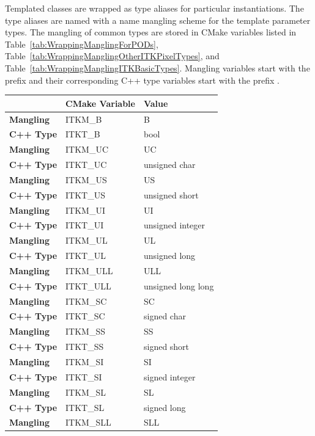 Templated classes are wrapped as type aliases for particular instantiations. The
type aliases are named with a name mangling scheme for the template parameter
types. The mangling of common types are stored in CMake variables listed in
Table~\ref{tab:WrappingManglingForPODs},
Table~\ref{tab:WrappingManglingOtherITKPixelTypes}, and
Table~\ref{tab:WrappingManglingITKBasicTypes}. Mangling variables start with the prefix
 and their corresponding C++ type variables start with the
prefix .

\begin{table}
\begin{center}
\begin{tabular}{lll}
\toprule
& \textbf{CMake Variable} & \textbf{Value} \\
\midrule
\midrule
\textbf{Mangling} & ITKM\_B & B \\
\textbf{C++ Type} & ITKT\_B & bool \\
\midrule
\textbf{Mangling} & ITKM\_UC & UC \\
\textbf{C++ Type} & ITKT\_UC & unsigned char \\
\midrule
\textbf{Mangling} & ITKM\_US & US \\
\textbf{C++ Type} & ITKT\_US & unsigned short \\
\midrule
\textbf{Mangling} & ITKM\_UI & UI \\
\textbf{C++ Type} & ITKT\_UI & unsigned integer \\
\midrule
\textbf{Mangling} & ITKM\_UL & UL \\
\textbf{C++ Type} & ITKT\_UL & unsigned long \\
\midrule
\textbf{Mangling} & ITKM\_ULL & ULL \\
\textbf{C++ Type} & ITKT\_ULL & unsigned long long \\
\midrule
\textbf{Mangling} & ITKM\_SC & SC \\
\textbf{C++ Type} & ITKT\_SC & signed char \\
\midrule
\textbf{Mangling} & ITKM\_SS & SS \\
\textbf{C++ Type} & ITKT\_SS & signed short \\
\midrule
\textbf{Mangling} & ITKM\_SI & SI \\
\textbf{C++ Type} & ITKT\_SI & signed integer \\
\midrule
\textbf{Mangling} & ITKM\_SL & SL \\
\textbf{C++ Type} & ITKT\_SL & signed long \\
\midrule
\textbf{Mangling} & ITKM\_SLL & SLL \\

\end{tabular}
\end{center}
\end{table}

